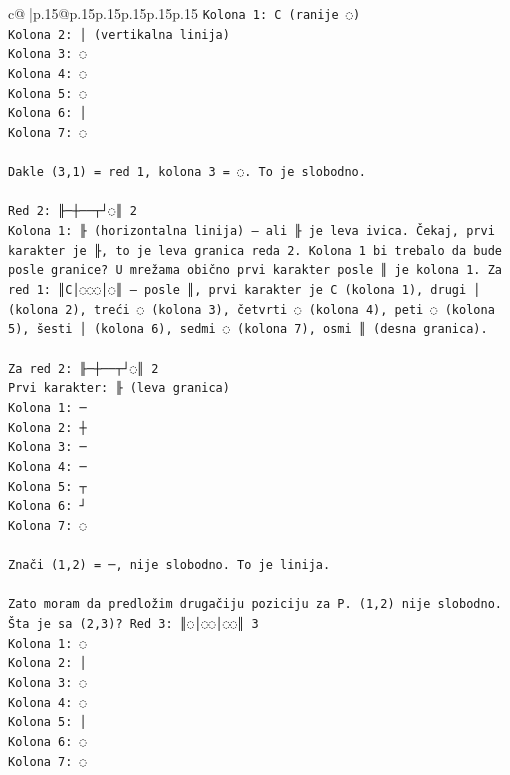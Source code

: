 \documentclass{article}
\begin{document}
{\begin{supertabular}{c@{$\;$}|p{.15\linewidth}@{}p{.15\linewidth}p{.15\linewidth}p{.15\linewidth}p{.15\linewidth}p{.15\linewidth}}
{{{\texttt{Kolona 1: C (ranije ◌)} \\
\texttt{Kolona 2: │ (vertikalna linija)} \\
\texttt{Kolona 3: ◌} \\
\texttt{Kolona 4: ◌} \\
\texttt{Kolona 5: ◌} \\
\texttt{Kolona 6: │} \\
\texttt{Kolona 7: ◌} \\
\\ 
\texttt{Dakle (3,1) = red 1, kolona 3 = ◌. To je slobodno.} \\
\\ 
\texttt{Red 2: ╟─┼──┬┘◌║ 2} \\
\texttt{Kolona 1: ╟ (horizontalna linija) — ali ╟ je leva ivica. Čekaj, prvi karakter je ╟, to je leva granica reda 2. Kolona 1 bi trebalo da bude posle granice? U mrežama obično prvi karakter posle ║ je kolona 1. Za red 1: ║C│◌◌◌│◌║ — posle ║, prvi karakter je C (kolona 1), drugi │ (kolona 2), treći ◌ (kolona 3), četvrti ◌ (kolona 4), peti ◌ (kolona 5), šesti │ (kolona 6), sedmi ◌ (kolona 7), osmi ║ (desna granica).} \\
\\ 
\texttt{Za red 2: ╟─┼──┬┘◌║ 2} \\
\texttt{Prvi karakter: ╟ (leva granica)} \\
\texttt{Kolona 1: ─} \\
\texttt{Kolona 2: ┼} \\
\texttt{Kolona 3: ─} \\
\texttt{Kolona 4: ─} \\
\texttt{Kolona 5: ┬} \\
\texttt{Kolona 6: ┘} \\
\texttt{Kolona 7: ◌} \\
\\ 
\texttt{Znači (1,2) = ─, nije slobodno. To je linija.} \\
\\ 
\texttt{Zato moram da predložim drugačiju poziciju za P. (1,2) nije slobodno. Šta je sa (2,3)? Red 3: ║◌│◌◌│◌◌║ 3} \\
\texttt{Kolona 1: ◌} \\
\texttt{Kolona 2: │} \\
\texttt{Kolona 3: ◌} \\
\texttt{Kolona 4: ◌} \\
\texttt{Kolona 5: │} \\
\texttt{Kolona 6: ◌} \\
\texttt{Kolona 7: ◌} \\
}}}
\end{supertabular}}
\end{document}
